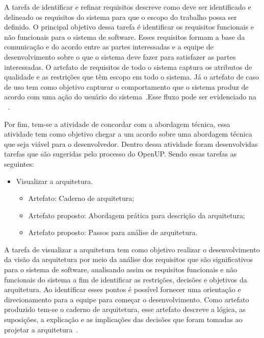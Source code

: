 %

A tarefa de identificar e refinar requisitos descreve como deve ser identificado e delineado os requisitos do sistema para que o escopo do trabalho possa ser definido. O principal objetivo dessa tarefa é identificar os requisitos funcionais e não funcionais para o sistema de software. Esses requisitos formam a base da comunicação e do acordo entre as partes interessadas e a equipe de desenvolvimento sobre o que o sistema deve fazer para satisfazer as partes interessadas. O artefato de requisitos de todo o sistema captura os atributos de qualidade e as restrições que têm escopo em todo o sistema. Já o artefato de caso de uso tem como objetivo capturar o comportamento que o sistema produz de acordo com uma ação do usuário do sistema~\cite{openup}.Esse fluxo pode ser evidenciado na ~.


Por fim, tem-se a atividade de concordar com a abordagem técnica, essa atividade tem como objetivo chegar a um acordo sobre uma abordagem técnica que seja viável para o desenvolvedor. Dentro dessa atividade foram desenvolvidas tarefas que são sugeridas pelo processo do \acrfull{OpenUP}. Sendo essas tarefas as seguintes:
\begin{itemize}
    \item Visualizar a arquitetura.
    \begin{itemize}
        \item Artefato: Caderno de arquitetura;
        \item Artefato proposto: Abordagem prática para descrição da arquitetura;
        \item Artefato proposto: Passos para análise de arquitetura.
    \end{itemize}
\end{itemize}

A tarefa de visualizar a arquitetura tem como objetivo realizar o desenvolvimento da visão da arquitetura por meio da análise dos requisitos que são significativos para o sistema de software, analisando assim os requisitos funcionais e não funcionais do sistema a fim de identificar as restrições, decisões e objetivos da arquitetura. Ao identificar esses pontos é possível fornecer uma orientação e direcionamento para a equipe para começar o desenvolvimento. Como artefato produzido tem-se o caderno de arquitetura, esse artefato descreve a lógica, as suposições, a explicação e as implicações das decisões que foram tomadas ao projetar a arquitetura~\cite{openup}.

